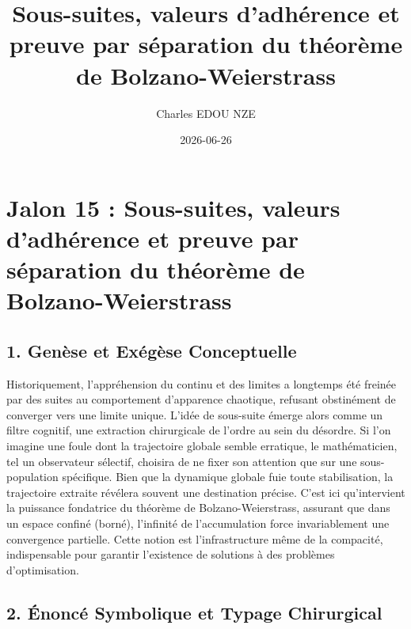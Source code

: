\documentclass{report}
\title{Sous-suites, valeurs d'adhérence et preuve par séparation du théorème de Bolzano-Weierstrass}
\author{Charles EDOU NZE}
\date{2026-06-26}
\begin{document}
\maketitle
\tableofcontents
\newpage

\chapter*{Jalon 15 : Sous-suites, valeurs d'adhérence et preuve par séparation du théorème de Bolzano-Weierstrass}

\section*{1. Genèse et Exégèse Conceptuelle}

Historiquement, l'appréhension du continu et des limites a longtemps été freinée par des suites au comportement d'apparence chaotique, refusant obstinément de converger vers une limite unique. L'idée de sous-suite émerge alors comme un filtre cognitif, une extraction chirurgicale de l'ordre au sein du désordre. Si l'on imagine une foule dont la trajectoire globale semble erratique, le mathématicien, tel un observateur sélectif, choisira de ne fixer son attention que sur une sous-population spécifique. Bien que la dynamique globale fuie toute stabilisation, la trajectoire extraite révélera souvent une destination précise. C'est ici qu'intervient la puissance fondatrice du théorème de Bolzano-Weierstrass, assurant que dans un espace confiné (borné), l'infinité de l'accumulation force invariablement une convergence partielle. Cette notion est l'infrastructure même de la compacité, indispensable pour garantir l'existence de solutions à des problèmes d'optimisation.

\section*{2. Énoncé Symbolique et Typage Chirurgical}
\end{document}
